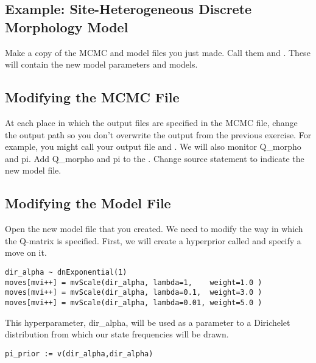 \subsection{Example: Site-Heterogeneous Discrete Morphology Model }

{\begin{framed}
Make a copy of the MCMC and model files you just made. 
Call them  and . 
These will contain the new model parameters and models. \par 
\end{framed}}

\subsection{Modifying the MCMC File}

At each place in which the output files are specified in the MCMC file, change the output path so you don't overwrite the output from the previous exercise. 
For example, you might call your output file  and .
We will also monitor Q\_morpho and pi.
Add Q\_morpho and pi to the . 
Change source statement to indicate the new model file.

\subsection{Modifying the Model File}
Open the new model file that you created. We need to modify the way in which the Q-matrix is specified.
First, we will create a hyperprior called  and specify a move on it.
{\tt \begin{snugshade*}
\begin{lstlisting}
dir_alpha ~ dnExponential(1)
moves[mvi++] = mvScale(dir_alpha, lambda=1,    weight=1.0 )
moves[mvi++] = mvScale(dir_alpha, lambda=0.1,  weight=3.0 )
moves[mvi++] = mvScale(dir_alpha, lambda=0.01, weight=5.0 )
\end{lstlisting}
\end{snugshade*}}

This hyperparameter, dir\_alpha, will be used as a parameter to a Dirichelet distribution from which our state frequencies will be drawn.

{\tt \begin{snugshade*}
\begin{lstlisting}
pi_prior := v(dir_alpha,dir_alpha)
\end{lstlisting}
\end{snugshade*}}

